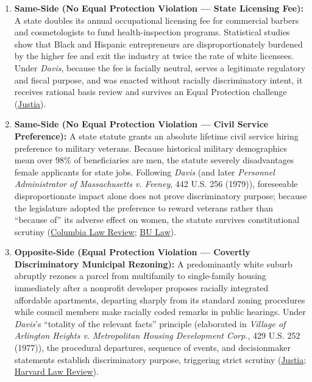\documentclass[12pt]{article}
\begin{document}
\begin{enumerate}
\item \textbf{Same-Side (No Equal Protection Violation --- State Licensing Fee):} A state doubles its annual occupational licensing fee for commercial barbers and cosmetologists to fund health-inspection programs. Statistical studies show that Black and Hispanic entrepreneurs are disproportionately burdened by the higher fee and exit the industry at twice the rate of white licensees. Under \textit{Davis}, because the fee is facially neutral, serves a legitimate regulatory and fiscal purpose, and was enacted without racially discriminatory intent, it receives rational basis review and survives an Equal Protection challenge (\href{https://supreme.justia.com/cases/federal/us/426/229/}{Justia}).

\item \textbf{Same-Side (No Equal Protection Violation --- Civil Service Preference):} A state statute grants an absolute lifetime civil service hiring preference to military veterans. Because historical military demographics mean over 98\% of beneficiaries are men, the statute severely disadvantages female applicants for state jobs. Following \textit{Davis} (and later \textit{Personnel Administrator of Massachusetts v. Feeney}, 442 U.S. 256 (1979)), foreseeable disproportionate impact alone does not prove discriminatory purpose; because the legislature adopted the preference to reward veterans rather than ``because of'' its adverse effect on women, the statute survives constitutional scrutiny (\href{https://www.columbialawreview.org/content/process-scrutiny-motivational-inquiry-and-constitutional-rights/}{Columbia Law Review}; \href{https://scholarship.law.bu.edu/cgi/viewcontent.cgi?article=1823&context=faculty_scholarship}{BU Law}).

\item \textbf{Opposite-Side (Equal Protection Violation --- Covertly Discriminatory Municipal Rezoning):} A predominantly white suburb abruptly rezones a parcel from multifamily to single-family housing immediately after a nonprofit developer proposes racially integrated affordable apartments, departing sharply from its standard zoning procedures while council members make racially coded remarks in public hearings. Under \textit{Davis}'s ``totality of the relevant facts'' principle (elaborated in \textit{Village of Arlington Heights v. Metropolitan Housing Development Corp.}, 429 U.S. 252 (1977)), the procedural departures, sequence of events, and decisionmaker statements establish discriminatory purpose, triggering strict scrutiny (\href{https://supreme.justia.com/cases/federal/us/426/229/}{Justia}; \href{https://harvardlawreview.org/print/vol-139/presidential-speech-and-the-discrimination-paradox/}{Harvard Law Review}).


\end{enumerate}
\end{document}
